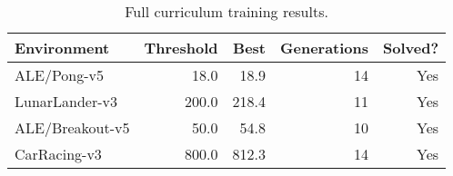 \begin{table}[!ht]
\centering
\begin{tabular}{lrrrr}
\hline
Environment & Threshold & Best & Generations & Solved? \\
\hline
ALE/Pong-v5 & 18.0 & 18.9 & 14 & Yes \\
LunarLander-v3 & 200.0 & 218.4 & 11 & Yes \\
ALE/Breakout-v5 & 50.0 & 54.8 & 10 & Yes \\
CarRacing-v3 & 800.0 & 812.3 & 14 & Yes \\
\hline
\end{tabular}
\caption{Full curriculum training results.}
\label{tab:full}
\end{table}

